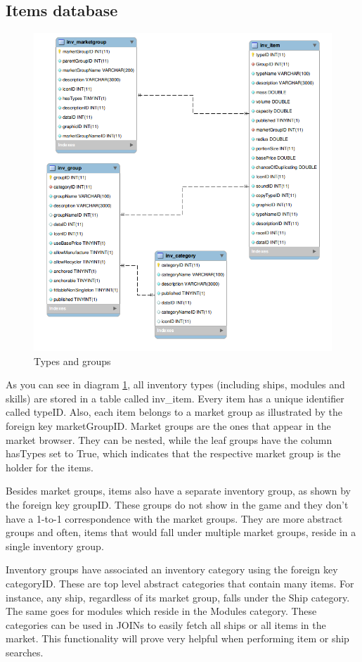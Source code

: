 \subsection{Items database}
\begin{figure}[h]
\centering
\includegraphics[width=0.7\linewidth]{src/img/items}
\caption{Types and groups}
\label{fig:items}
\end{figure}

As you can see in diagram \ref{fig:items}, all inventory types (including ships, modules and skills) are stored in a table called inv_item. Every item has a unique identifier called typeID. Also, each item belongs to a market group as illustrated by the foreign key marketGroupID. Market groups are the ones that appear in the market browser. They can be nested, while the leaf groups have the column hasTypes set to True, which indicates that the respective market group is the holder for the items.

Besides market groups, items also have a separate inventory group, as shown by the foreign key groupID. These groups do not show in the game and they don’t have a 1-to-1 correspondence with the market groups. They are more abstract groups and often, items that would fall under multiple market groups, reside in a single inventory group.

Inventory groups have associated an inventory category using the foreign key categoryID. These are top level abstract categories that contain many items. For instance, any ship, regardless of its market group, falls under the Ship category. The same goes for modules which reside in the Modules category. These categories can be used in JOINs to easily fetch all ships or all items in the market. This functionality will prove very helpful when performing item or ship searches.

